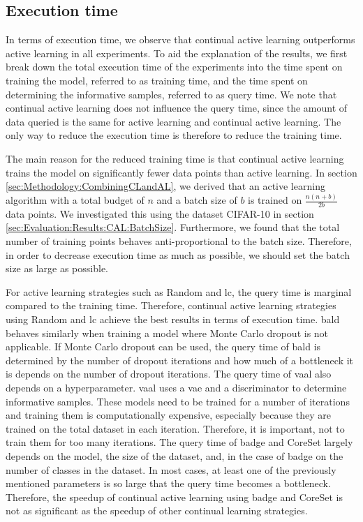 \subsection{Execution time}
\label{sec:Discussion:ExecutionTime}
In terms of execution time, we observe that continual active learning outperforms active learning in all experiments. To aid the explanation of the
results, we first break down the total execution time of the experiments into the time spent on training the model, referred to as training time,
and the time spent on determining the informative samples, referred to as query time. We note that continual active learning does not influence the 
query time, since the amount of data queried is the same for active learning and continual active learning. The only way to reduce the execution time
is therefore to reduce the training time. \par
The main reason for the reduced training time is that continual active learning trains the model on significantly fewer data points than active learning.
In section \ref{sec:Methodology:CombiningCLandAL}, we derived that an active learning algorithm with a total budget of $n$ and a batch size of $b$ is
trained on $\frac{n(n+b)}{2b}$ data points. We investigated this using the dataset CIFAR-10 in section \ref{sec:Evaluation:Results:CAL:BatchSize}.
Furthermore, we found that the total number of training points behaves anti-proportional to the batch size. Therefore, in order to decrease execution
time as much as possible, we should set the batch size as large as possible. \par
For active learning strategies such as Random and \gls{lc}, the query time is marginal compared to the training time. Therefore, continual active learning
strategies using Random and \gls{lc} achieve the best results in terms of execution time. \gls{bald} behaves similarly when training a model where Monte
Carlo dropout is not applicable. If Monte Carlo dropout can be used, the query time of \gls{bald} is determined by the number of dropout iterations
and how much of a bottleneck it is depends on the number of dropout iterations. The query time of \gls{vaal} also depends on a hyperparameter.
\gls{vaal} uses a \gls{vae} and a discriminator to determine informative samples. These models need to be trained for a number of iterations and training
them is computationally expensive, especially because they are trained on the total dataset in each iteration. Therefore, it is important, not to train
them for too many iterations. The query time of \gls{badge} and CoreSet largely depends on the model, the size of the dataset, and, in the case of
\gls{badge} on the number of classes in the dataset. In most cases, at least one of the previously mentioned parameters is so large that the query time
becomes a bottleneck. Therefore, the speedup of continual active learning using \gls{badge} and CoreSet is not as significant as the speedup of other
continual learning strategies. \par


